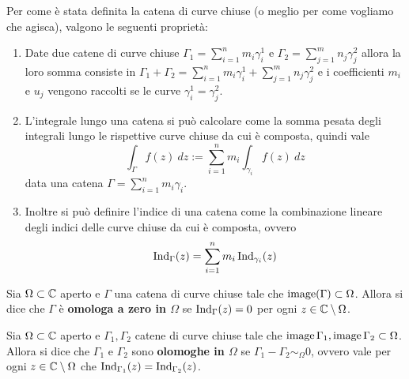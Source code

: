 \begin{remark}
  Per come è stata definita la catena di curve chiuse (o meglio per come vogliamo
  che agisca), valgono le seguenti proprietà:
  \begin{enumerate}
    \item Date due catene di curve chiuse $\Gamma_1 = \sum^n_{i=1} m_i
      \gamma^1_i$ e $\Gamma_2 = \sum^m_{j=1} n_j \gamma^2_j$ allora la loro
      somma consiste in $\Gamma_1 + \Gamma_2 =  \sum^n_{i=1} m_i
      \gamma^1_i + \sum^m_{j=1} n_j \gamma^2_j$ e i coefficienti $m_i$
      e $u_j$ vengono raccolti se le curve $\gamma^1_i = \gamma^2_j$.
    \item L'integrale lungo una catena si può calcolare come la somma pesata
      degli integrali lungo le rispettive curve chiuse da cui è composta,
      quindi vale 
      \begin{equation*}
        \int_\Gamma f(z)\ dz := \sum^n_{i=1} m_i \int_{\gamma_i} f(z)\ dz
      \end{equation*}
      data una catena $\Gamma = \sum^n_{i=1} m_i\gamma_i$.
    \item Inoltre si può definire l'indice di una catena come la
      combinazione lineare degli indici delle curve chiuse da cui
      è composta, ovvero 
      \begin{equation*}
        \operatorname{Ind}_\Gamma(z) = \sum^n_{i=1} m_i
        \operatorname{Ind}_{\gamma_i}(z)
      \end{equation*}
  \end{enumerate}
  \label{rmk:operazioni-intuitive-per-le-catene-di-curve-chiuse}
\end{remark}


\begin{definition}
  \label{def:omologia-a-zero}
  Sia $\Omega \subset \mathbb{C}$ aperto e $\Gamma$ una catena di curve chiuse tale
  che $\operatorname{image}(\Gamma) \subset \Omega$. Allora si dice che $\Gamma$
  è \textbf{omologa a zero in $\Omega$} se $\operatorname{Ind}_\Gamma(z)
  = 0$ per ogni $z \in \mathbb{C} \setminus \Omega$. 
\end{definition}

\begin{definition}
  \label{def:omologia-tra-catene}
  Sia $\Omega \subset \mathbb{C}$ aperto e $\Gamma_1,\Gamma_2$ catene di curve 
  chiuse tale che $\operatorname{image}{\Gamma_1}, \operatorname{image}{\Gamma_2} \subset \Omega$. 
  Allora si dice che $\Gamma_1$ e $\Gamma_2$ sono \textbf{olomoghe in 
  $\Omega$} se $\Gamma_1 - \Gamma_2 \sim_\Omega 0$, ovvero vale per ogni $z
  \in \mathbb{C} \setminus \Omega$ che $\operatorname{Ind}_{\Gamma_1}(z)
  = \operatorname{Ind}_{\Gamma_2}(z)$.
\end{definition}

